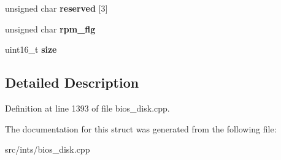 \begin{DoxyCompactItemize}
\item 
\hypertarget{structD88SEC_ae71af3325f276f748b4966972fd3832c}{unsigned char {\bfseries reserved} \mbox{[}3\mbox{]}}\label{structD88SEC_ae71af3325f276f748b4966972fd3832c}

\item 
\hypertarget{structD88SEC_a2bfa52815aee40f7c5383a0a51175aa3}{unsigned char {\bfseries rpm\-\_\-flg}}\label{structD88SEC_a2bfa52815aee40f7c5383a0a51175aa3}

\item 
\hypertarget{structD88SEC_af830ea69e2aa174d018743dfbc12edce}{uint16\-\_\-t {\bfseries size}}\label{structD88SEC_af830ea69e2aa174d018743dfbc12edce}

\end{DoxyCompactItemize}


\subsection{Detailed Description}


Definition at line 1393 of file bios\-\_\-disk.\-cpp.



The documentation for this struct was generated from the following file\-:\begin{DoxyCompactItemize}
\item 
src/ints/bios\-\_\-disk.\-cpp\end{DoxyCompactItemize}
